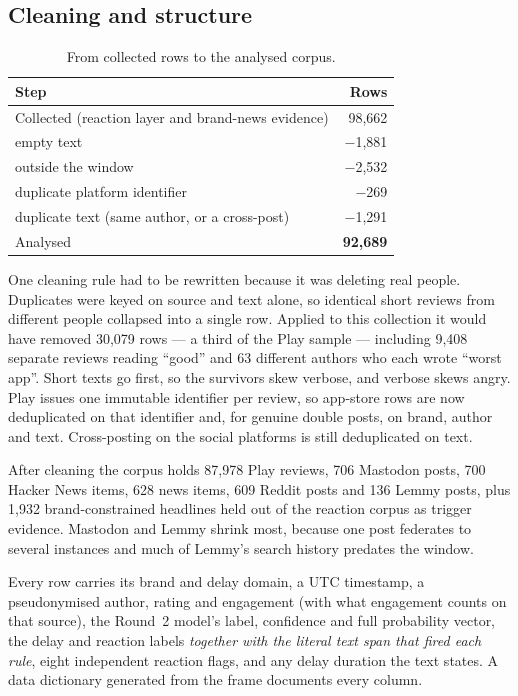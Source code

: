 \documentclass[11pt,a4paper]{article}
\begin{document}
\subsection{Cleaning and structure}

\begin{table}[htbp]\centering\small
\caption{From collected rows to the analysed corpus.}\label{tab:clean}
\begin{tabular}{@{}lr@{}}
\toprule
Step & Rows\\
\midrule
Collected (reaction layer and brand-news evidence) & 98,662\\
\quad empty text & $-$1,881\\
\quad outside the window & $-$2,532\\
\quad duplicate platform identifier & $-$269\\
\quad duplicate text (same author, or a cross-post) & $-$1,291\\
\midrule
Analysed & \textbf{92,689}\\
\bottomrule
\end{tabular}
\end{table}

One cleaning rule had to be rewritten because it was deleting real people. Duplicates were keyed on source and text alone, so identical short reviews from different people collapsed into a single row. Applied to this collection it would have removed 30,079 rows --- a third of the Play sample --- including 9,408 separate reviews reading ``good'' and 63 different authors who each wrote ``worst app''. Short texts go first, so the survivors skew verbose, and verbose skews angry. Play issues one immutable identifier per review, so app-store rows are now deduplicated on that identifier and, for genuine double posts, on brand, author and text. Cross-posting on the social platforms is still deduplicated on text.

After cleaning the corpus holds 87,978 Play reviews, 706 Mastodon posts, 700 Hacker News items, 628 news items, 609 Reddit posts and 136 Lemmy posts, plus 1,932 brand-constrained headlines held out of the reaction corpus as trigger evidence. Mastodon and Lemmy shrink most, because one post federates to several instances and much of Lemmy's search history predates the window.

Every row carries its brand and delay domain, a UTC timestamp, a pseudonymised author, rating and engagement (with what engagement counts on that source), the Round~2 model's label, confidence and full probability vector, the delay and reaction labels \emph{together with the literal text span that fired each rule}, eight independent reaction flags, and any delay duration the text states. A data dictionary generated from the frame documents every column.
\end{document}
